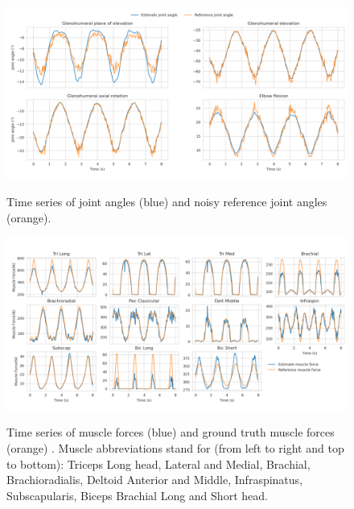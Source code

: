 \begin{figure}[t!] 
\centering 
\includegraphics[width=\textwidth]{figures/joint_angles_MHE.pdf}\\ 
\caption{Time series of  joint angles (blue) and noisy reference joint angles (orange).} 
\label{fig:joint_angles_MHE} 
\end{figure} 

\begin{figure}[t!] 
\centering 
\includegraphics[width=\textwidth]{figures/Muscle_Forces_MHE.pdf}\\ 
\caption{Time series of  muscle forces (blue) and ground truth muscle forces (orange) . 
Muscle abbreviations stand for (from left to right and top to bottom): Triceps Long head, Lateral and Medial, Brachial, Brachioradialis, Deltoid Anterior and Middle, Infraspinatus, Subscapularis, Biceps Brachial Long and Short head.} 
\label{fig:muscle_forces_MHE} 
\end{figure} 



